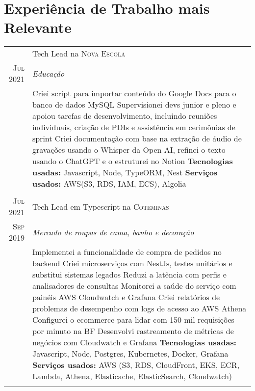 \documentclass[a4paper,10pt]{article}
\begin{document}
\section{Experiência de Trabalho mais Relevante}
\begin{tabular}{r|p{11cm}}

\textsc & Tech Lead na \textsc{Nova Escola} \\\textsc{Jul 2021}&\emph{Educação }\\&\footnotesize{ 
 Criei script para importar conteúdo do Google Docs para o banco de dados MySQL \newline
 Supervisionei devs junior e pleno e apoiou tarefas de desenvolvimento, incluindo reuniões individuais, criação de PDIs e assistência em cerimônias de sprint \newline
 Criei documentação com base na extração de áudio de gravações usando o Whisper da Open AI, refinei o texto usando o ChatGPT e o estruturei no Notion \newline
 \textbf{Tecnologias usadas:} Javascript, Node, TypeORM, Nest \newline
\textbf{Serviços usados:} AWS(S3, RDS, IAM, ECS), Algolia}\\\multicolumn{2}{c}{} \\


\textsc{Jul 2021} & Tech Lead em Typescript na \textsc{Coteminas} \\\textsc{Sep 2019}&\emph{Mercado de roupas de cama, banho e decoração }\\&\footnotesize{ 
 Implementei a funcionalidade de compra de pedidos no backend \newline
 Criei microserviços com NestJs, testes unitários e substitui sistemas legados \newline
 Reduzi a latência com perfis e analisadores de consultas \newline
 Monitorei a saúde do serviço com painéis AWS Cloudwatch e Grafana \newline
 Criei relatórios de problemas de desempenho com logs de acesso ao AWS Athena \newline
 Configurei o ecommerce para lidar com 150 mil requisições por minuto na BF \newline
 Desenvolvi rastreamento de métricas de negócios com Cloudwatch e Grafana \newline 
\textbf{Tecnologias usadas:} Javascript, Node, Postgres, Kubernetes, Docker, Grafana \newline
\textbf{Serviços usados:} AWS (S3, RDS, CloudFront, EKS, ECR, Lambda, Athena, Elasticache, ElasticSearch, Cloudwatch)}\\\multicolumn{2}{c}{} \\



\end{tabular}
\end{document}
